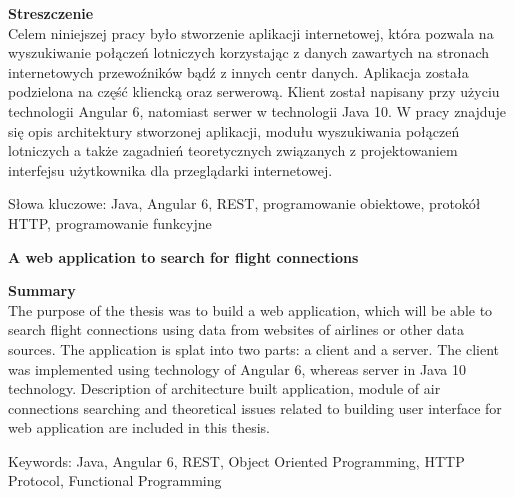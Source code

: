 \documentclass[12pt, twoside]{report}
\newcommand\tab[1][0.5cm]{\hspace*{#1}}
\newcommand\blankpage{%
	\null
    \thispagestyle{empty}%
    \newpage}
\begin{document}
\begin{flushleft}
	{\fontsize{14pt}{12pt}\selectfont
		\textbf{Streszczenie}}\\
	\vspace{1cm}
\tab Celem niniejszej pracy było stworzenie aplikacji internetowej, która pozwala na wyszukiwanie połączeń lotniczych korzystając z danych zawartych na stronach internetowych przewoźników bądź z innych centr danych. Aplikacja została podzielona na część kliencką oraz serwerową. Klient został napisany przy użyciu technologii Angular 6, natomiast serwer w technologii Java 10. W pracy znajduje się opis architektury stworzonej aplikacji, modułu wyszukiwania połączeń lotniczych a także zagadnień teoretycznych związanych z projektowaniem interfejsu użytkownika dla przeglądarki internetowej.
\end{flushleft}
\vspace{0.5cm}
Słowa kluczowe: Java, Angular 6, REST, programowanie obiektowe, protokół HTTP, programowanie funkcyjne

\vspace{1.5cm}

\begin{center}
	{\fontsize{14pt}{12pt}\selectfont
		\textbf{A web application to search for flight connections}}
\end{center}

\begin{flushleft}
	{\fontsize{14pt}{12pt}\selectfont
		\textbf{Summary}}\\
	\vspace{1cm}
\tab The purpose of the thesis was to build a web application, which will be able to search flight connections using data from websites of airlines or other data sources. The application is splat into two parts: a client and a server. The client was implemented using technology of Angular 6, whereas server in Java 10 technology. Description of architecture built application, module of air connections searching and theoretical issues related to building user interface for web application are included in this thesis. 
\end{flushleft}
\vspace{0.5cm}
Keywords: Java, Angular 6, REST, Object Oriented Programming, HTTP Protocol, Functional Programming
\afterpage{\blankpage}


\renewcommand{\contentsname}{Spis treści}
\setcounter{page}{9}
\tableofcontents
\end{document}
